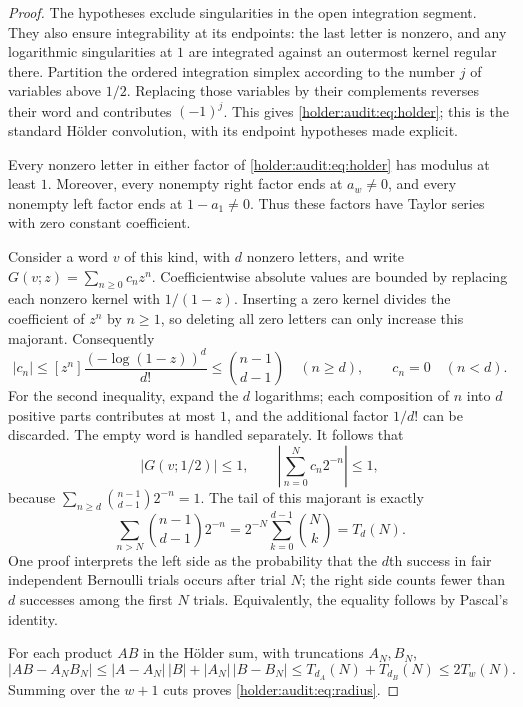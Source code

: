 \begin{proof}
The hypotheses exclude singularities in the open integration segment.
They also ensure integrability at its endpoints: the last letter is
nonzero, and any logarithmic singularities at $1$ are integrated against
an outermost kernel regular there. Partition the ordered integration
simplex according to the number $j$ of variables above $1/2$. Replacing
those variables by their complements reverses their word and contributes
$(-1)^j$. This gives \eqref{holder:audit:eq:holder}; this is the standard Hölder
convolution, with its endpoint hypotheses made explicit.

Every nonzero letter in either factor of \eqref{holder:audit:eq:holder} has
modulus at least $1$. Moreover, every nonempty right factor ends at
$a_w\ne0$, and every nonempty left factor ends at $1-a_1\ne0$.
Thus these factors have Taylor series with zero constant coefficient.

Consider a word $v$ of this kind, with $d$ nonzero letters, and write
$G(v;z)=\sum_{n\geq0}c_nz^n$. Coefficientwise absolute values are bounded
by replacing each nonzero kernel with $1/(1-z)$. Inserting a zero kernel
divides the coefficient of $z^n$ by $n\geq1$, so deleting all zero letters
can only increase this majorant. Consequently
\[
 |c_n|\leq[z^n]\frac{(-\log(1-z))^d}{d!}
 \leq\binom{n-1}{d-1}\quad(n\geq d),
 \qquad c_n=0\quad(n<d).
\]
For the second inequality, expand the $d$ logarithms; each composition of
$n$ into $d$ positive parts contributes at most $1$, and the additional
factor $1/d!$ can be discarded. The empty word is handled separately.
It follows that
\[
 |G(v;1/2)|\leq1,\qquad
 \left|\sum_{n=0}^Nc_n2^{-n}\right|\leq1,
\]
because $\sum_{n\geq d}\binom{n-1}{d-1}2^{-n}=1$.
The tail of this majorant is exactly
\[
 \sum_{n>N}\binom{n-1}{d-1}2^{-n}
 =2^{-N}\sum_{k=0}^{d-1}\binom Nk=T_d(N).
\]
One proof interprets the left side as the probability that the $d$th
success in fair independent Bernoulli trials occurs after trial $N$;
the right side counts fewer than $d$ successes among the first $N$
trials. Equivalently, the equality follows by Pascal's identity.

For each product $AB$ in the Hölder sum, with truncations $A_N,B_N$,
\[
 |AB-A_NB_N|
 \leq |A-A_N|\,|B|+|A_N|\,|B-B_N|
 \leq T_{d_A}(N)+T_{d_B}(N)\leq2T_w(N).
\]
Summing over the $w+1$ cuts proves \eqref{holder:audit:eq:radius}.


\end{proof}

